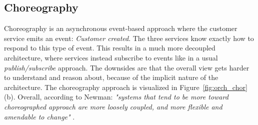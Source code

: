 \subsection*{Choreography}
Choreography is an asynchronous event-based approach where the customer service emits an event: \textit{Customer created}. The three services know exactly how to respond to this type of event. This results in a much more decoupled architecture, where services instead subscribe to events like in a usual \textit{publish/subscribe} approach. The downsides are that the overall view gets harder to understand and reason about, because of the implicit nature of the architecture. The choreography approach is visualized in Figure~\ref{fig:orch_chor} (b).
Overall, according to Newman: \textit{"systems that tend to be more toward choreographed approach are more loosely coupled, and more flexible and amendable to change"} \cite[p. 45]{newman2015building}.